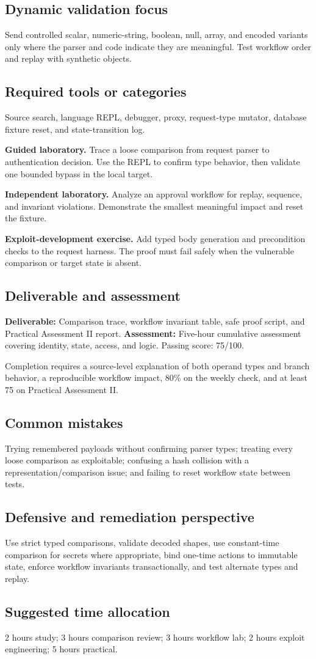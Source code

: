 \documentclass[11pt]{article}
\newcommand{\weekfield}[2]{%
  \Needspace{5\baselineskip}
  \subsection*{#1}
  #2
}
\newcommand{\deliverable}[1]{\textbf{Deliverable:} #1}
\newcommand{\assessment}[1]{\textbf{Assessment:} #1}
\begin{document}
\weekfield{Dynamic validation focus}{Send controlled scalar, numeric-string,
boolean, null, array, and encoded variants only where the parser and code indicate
they are meaningful. Test workflow order and replay with synthetic objects.}

\weekfield{Required tools or categories}{Source search, language REPL, debugger,
proxy, request-type mutator, database fixture reset, and state-transition log.}

\begin{labbox}
\textbf{Guided laboratory.} Trace a loose comparison from request parser to
authentication decision. Use the REPL to confirm type behavior, then validate one
bounded bypass in the local target.

\textbf{Independent laboratory.} Analyze an approval workflow for replay,
sequence, and invariant violations. Demonstrate the smallest meaningful impact
and reset the fixture.

\textbf{Exploit-development exercise.} Add typed body generation and precondition
checks to the request harness. The proof must fail safely when the vulnerable
comparison or target state is absent.
\end{labbox}

\weekfield{Deliverable and assessment}{\deliverable{Comparison trace, workflow
invariant table, safe proof script, and Practical Assessment II report.}
\assessment{Five-hour cumulative assessment covering identity, state, access,
and logic. Passing score: 75/100.}}

\begin{checkpoints}
Completion requires a source-level explanation of both operand types and branch
behavior, a reproducible workflow impact, 80\% on the weekly check, and at least
75 on Practical Assessment II.
\end{checkpoints}

\weekfield{Common mistakes}{Trying remembered payloads without confirming parser
types; treating every loose comparison as exploitable; confusing a hash collision
with a representation/comparison issue; and failing to reset workflow state
between tests.}

\weekfield{Defensive and remediation perspective}{Use strict typed comparisons,
validate decoded shapes, use constant-time comparison for secrets where
appropriate, bind one-time actions to immutable state, enforce workflow
invariants transactionally, and test alternate types and replay.}

\weekfield{Suggested time allocation}{2 hours study; 3 hours comparison review;
3 hours workflow lab; 2 hours exploit engineering; 5 hours practical.}
\end{document}
